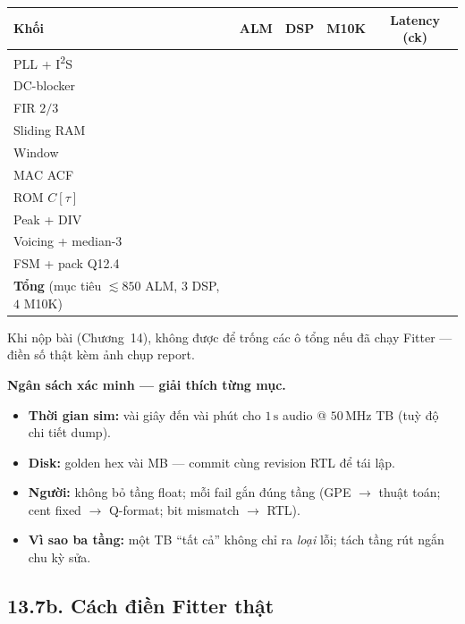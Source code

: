 \begin{center}\small
\begin{tabular}{@{}lcccc@{}}\toprule
Khối & ALM & DSP & M10K & Latency (ck) \\
\midrule
PLL + I\textsuperscript{2}S &  &  &  & \\
DC-blocker &  &  &  & \\
FIR $2/3$ &  &  &  & \\
Sliding RAM &  &  &  & \\
Window &  &  &  & \\
MAC ACF &  &  &  & \\
ROM $C[\tau]$ &  &  &  & \\
Peak + DIV &  &  &  & \\
Voicing + median-3 &  &  &  & \\
FSM + pack Q12.4 &  &  &  & \\
\midrule
\textbf{Tổng} (mục tiêu $\lesssim 850$ ALM, $3$ DSP, $4$ M10K) &  &  &  & \\
\bottomrule
\end{tabular}
\end{center}

\noindent Khi nộp bài (Chương~14), không được để trống các ô tổng nếu đã chạy Fitter --- điền số thật kèm ảnh chụp report.

\begin{costbox}
\textbf{Ngân sách xác minh --- giải thích từng mục.}
\begin{itemize}[leftmargin=1.2em]
    \item \textbf{Thời gian sim:} vài giây đến vài phút cho $1\,\text{s}$ audio @ $50\,\text{MHz}$ TB (tuỳ độ chi tiết dump).
    \item \textbf{Disk:} golden hex vài MB --- commit cùng revision RTL để tái lập.
    \item \textbf{Người:} không bỏ tầng float; mỗi fail gắn đúng tầng (GPE $\to$ thuật toán; cent fixed $\to$ Q-format; bit mismatch $\to$ RTL).
    \item \textbf{Vì sao ba tầng:} một TB ``tất cả'' không chỉ ra \emph{loại} lỗi; tách tầng rút ngắn chu kỳ sửa.
\end{itemize}
\end{costbox}


\subsection*{13.7b. Cách điền Fitter thật}

